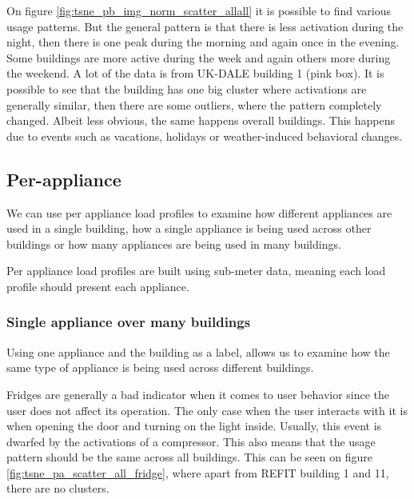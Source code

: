 On figure \ref{fig:tsne_pb_img_norm_scatter_allall} it is possible to find various usage patterns. 
But the general pattern is that there is less activation during the night, then there is one peak during the morning and again once in the evening.
Some buildings are more active during the week and again others more during the weekend.
A lot of the data is from UK-DALE building 1 (pink box). 
It is possible to see that the building has one big cluster where activations are generally similar, then there are some outliers,
where the pattern completely changed. 
Albeit less obvious, the same happens overall buildings.
This happens due to events such as vacations, holidays or weather-induced behavioral changes.

\subsection{Per-appliance}

We can use per appliance load profiles to examine how different appliances 
are used in a single building, how a single appliance is being used across other buildings
or how many appliances are being used in many buildings.

Per appliance load profiles are built using sub-meter data,
meaning each load profile should present each appliance.

\subsubsection{Single appliance over many buildings}

Using one appliance and the building as a label,
allows us to examine how the same type of appliance is being used across different buildings.

Fridges are generally a bad indicator when it comes to user behavior since the user does not affect its operation. 
The only case when the user interacts with it is when opening the door and turning on the light inside. 
Usually, this event is dwarfed by the activations of a compressor. 
This also means that the usage pattern should be the same across all buildings. 
This can be seen on figure \ref{fig:tsne_pa_scatter_all_fridge}, 
where apart from REFIT building 1 and 11, there are no clusters.


